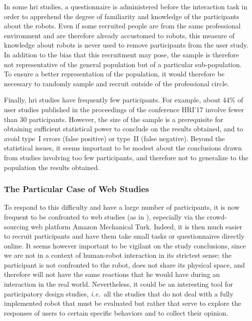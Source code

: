 \documentclass[a4paper,11pt,twoside]{StyleThese}
\begin{document}
In some \acrshort{hri} studies, a questionnaire is administered before the interaction task in order to apprehend the degree of familiarity and knowledge of the participants about the robots. Even if some recruited people are from the same professional environment and are therefore already accustomed to robots, this measure of knowledge about robots is never used to remove participants from the user study. In addition to the bias that this recruitment may pose, the sample is therefore not representative of the general population but of a particular sub-population. To ensure a better representation of the population, it would therefore be necessary to randomly sample and recruit outside of the professional circle.

Finally, \acrshort{hri} studies have frequently few participants. For example, about 44\% of user studies published in the proceedings of the conference HRI'17 involve fewer than 30 participants. However, the size of the sample is a prerequisite for obtaining sufficient statistical power to conclude on the results obtained, and to avoid type~I errors (false positive) or type~II (false negative). Beyond the statistical issues, it seems important to be modest about the conclusions drawn from studies involving too few participants, and therefore not to generalize to the population the results obtained.

\subsubsection*{The Particular Case of Web Studies}

To respond to this difficulty and have a large number of participants, it is now frequent to be confronted to web studies (as in \cite{khambhaita_head-body_2016}), especially via the crowd-sourcing web platform Amazon Mechanical Turk. Indeed, it is then much easier to recruit participants and have them take small tasks or questionnaires directly online. It seems however important to be vigilant on the study conclusions, since we are not in a context of human-robot interaction in its strictest sense; the participant is not confronted to the robot, does not share its physical space, and therefore will not have the same reactions that he would have during an interaction in the real world. Nevertheless, it could be an interesting tool for participatory design studies, \textit{i.e.}~all the studies that do not deal with a fully implemented robot that must be evaluated but rather that serve to explore the responses of users to certain specific behaviors and to collect their opinion. 
\end{document}
